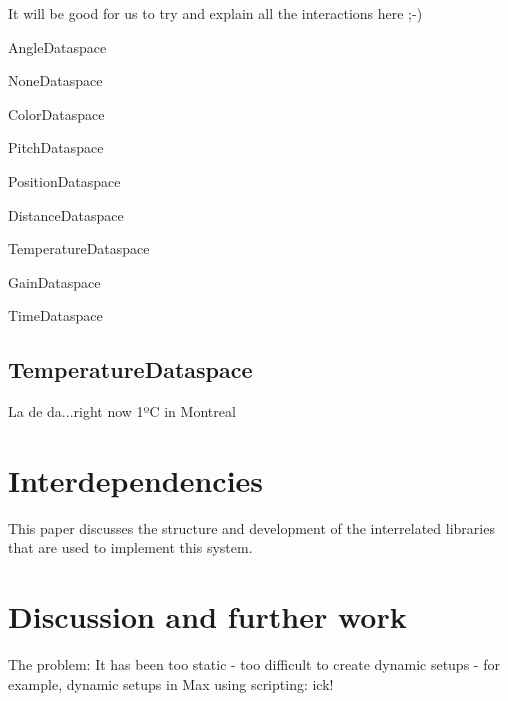 \documentclass{article}
\newenvironment{packed_item}{
\begin{itemize}
  \setlength{\itemsep}{1pt}
  \setlength{\parskip}{0pt}
  \setlength{\parsep}{0pt}
}{\end{itemize}}
\begin{document}
It will be good for us to try and explain all the interactions here ;-) 
\begin{packed_item}
	\item AngleDataspace
	\item NoneDataspace
	\item ColorDataspace
	\item PitchDataspace
	\item PositionDataspace
	\item DistanceDataspace
    \item TemperatureDataspace
    \item GainDataspace
	\item TimeDataspace
\end{packed_item}
	


\subsection{TemperatureDataspace}\label{subsec:temperature_dataspace}

La de da...right now 1ºC in Montreal %



\section{Interdependencies}\label{sec:interdependencies}

This paper discusses the structure and development of the interrelated libraries that are used to implement this system.



\section{Discussion and further work} %
\label{sec:discussion_and_further_work}

The problem: 
It has been too static
    - too difficult to create dynamic setups
    - for example, dynamic setups in Max using scripting: ick!
\end{document}
